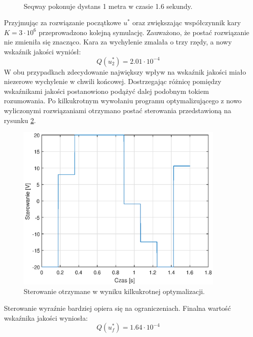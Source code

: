 \begin{figure}[H]
	~~
	\caption{Seqway pokonuje dystans 1 metra w czasie 1.6 sekundy.}
	\label{fig:equ1}
\end{figure}
Przyjmując za rozwiązanie początkowe \(u^*\) oraz zwiększając współczynnik kary \(K=3\cdot10^6\) przeprowadzono kolejną symulację. Zauważono, że postać rozwiązanie nie zmieniła się znacząco. Kara za wychylenie zmalała o trzy rzędy, a nowy wskaźnik jakości wyniósł:
\begin{equation}
Q(u_2^*)=2.01\cdot10^{-4}
\end{equation}
W obu przypadkach zdecydowanie największy wpływ na wskaźnik jakości miało niezerowe wychylenie w chwili końcowej. Dostrzegając różnicę pomiędzy wskaźnikami jakości postanowiono podążyć dalej podobnym tokiem rozumowania. Po kilkukrotnym wywołaniu programu optymalizującego z nowo wyliczonymi rozwiązaniami otrzymano postać sterowania przedstawioną na rysunku \ref{fig:ctrNew}.
\begin{figure}[H]
	\centering
	\includegraphics[width=4in]{Figures/exp1/controlNew.eps}
	\caption{Sterowanie otrzymane w wyniku kilkukrotnej optymalizacji.}
	\label{fig:ctrNew}
\end{figure}
Sterowanie wyraźnie bardziej opiera się na ograniczeniach. Finalna wartość wskaźnika jakości wyniosła: \begin{equation}
Q(u_f^*)=1.64\cdot10^{-4}
\end{equation}